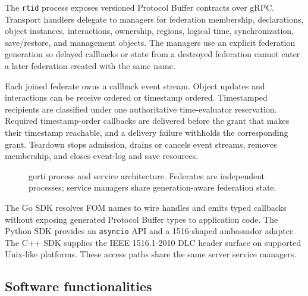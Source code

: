 \documentclass[preprint,12pt,a4paper]{elsarticle}
\begin{document}
The \texttt{rtid} process exposes versioned Protocol Buffer contracts over
gRPC. Transport handlers delegate to managers for federation membership,
declarations, object instances, interactions, ownership, regions, logical
time, synchronization, save/restore, and management objects. The managers use
an explicit federation generation so delayed callbacks or state from a
destroyed federation cannot enter a later federation created with the same
name.

Each joined federate owns a callback event stream. Object updates and
interactions can be receive ordered or timestamp ordered. Timestamped
recipients are classified under one authoritative time-evaluator reservation.
Required timestamp-order callbacks are delivered before the grant that makes
their timestamp reachable, and a delivery failure withholds the corresponding
grant. Teardown stops admission, drains or cancels event streams, removes
membership, and closes event-log and save resources.

\begin{figure}[!h]
\centering
{}
\caption{gorti process and service architecture. Federates are independent
processes; service managers share generation-aware federation state.}
\label{fig:architecture}
\end{figure}

The Go SDK resolves FOM names to wire handles and emits typed callbacks without
exposing generated Protocol Buffer types to application code. The Python SDK
provides an \texttt{asyncio} API and a 1516-shaped ambassador adapter. The C++
SDK supplies the IEEE 1516.1-2010 DLC header surface on supported Unix-like
platforms. These access paths share the same server service managers.

\subsection{Software functionalities}
\end{document}
